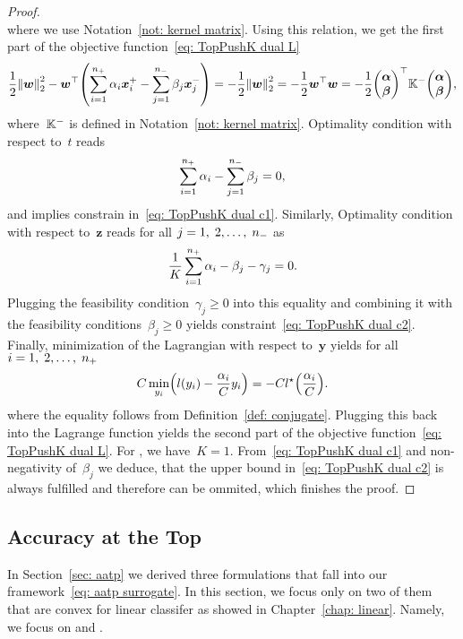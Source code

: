 \begin{proof}
\begin{equation*}
  \end{equation*}
  where we use Notation~\ref{not: kernel matrix}. Using this relation, we get the first part of the objective function~\eqref{eq: TopPushK dual L} 
  \begin{equation*}
    \frac{1}{2} \norm{\bm{w}}_{2}^{2} - \bm{w}^{\top} \Brac{\sum_{i = 1}^{\npos} \alpha_i \bm{x}^+_i - \sum_{j = 1}^{\nneg} \beta_j \bm{x}^-_j}
      = - \frac{1}{2} \norm{\bm{w}}_{2}^{2}
      = - \frac{1}{2} \bm{w}^{\top} \bm{w}
      = - \frac{1}{2} \vecab^{\top} \Kneg \vecab,
  \end{equation*}
  where~$\mathbb{K}^{-}$ is defined in Notation~\ref{not: kernel matrix}. Optimality condition with respect to~$t$ reads 
  \begin{equation*}
    \sum_{i = 1}^{n_{+}} \alpha_i - \sum_{j = 1}^{n_{-}} \beta_j = 0,
  \end{equation*}
  and implies constrain in~\eqref{eq: TopPushK dual c1}. Similarly, Optimality condition with respect to~$\bm{z}$ reads for all $j = 1, \; 2, \ldots, \; n_{-}$ as 
  \begin{equation*}
    \frac{1}{K} \sum_{i = 1}^{n_{+}} \alpha_i - \beta_j - \gamma_j = 0.
  \end{equation*}
  Plugging the feasibility condition~$\gamma_j \geq 0$ into this equality and combining it with the feasibility conditions~$\beta_j \geq 0$ yields constraint~\eqref{eq: TopPushK dual c2}. Finally, minimization of the Lagrangian with respect to~$\bm{y}$ yields for all $i = 1, \; 2, \ldots, \; n_{+}$ 
  \begin{equation*}
    C \min_{y_i} \Brac{l(y_i) - \frac{\alpha_i}{C} y_i} = - C l^{\star} \Brac{\frac{\alpha_i}{C}}.
  \end{equation*}
  where the equality follows from Definition~\ref{def: conjugate}. Plugging this back into the Lagrange function yields the second part of the objective function~\eqref{eq: TopPushK dual L}. For \TopPush, we have~$K = 1.$ From~\eqref{eq: TopPushK dual c1} and non-negativity of~$\beta_j$ we deduce, that the upper bound in~\eqref{eq: TopPushK dual c2} is always fulfilled and therefore can be ommited, which finishes the proof. 
\end{proof}

\subsection{Accuracy at the Top}

In Section~\ref{sec: aatp} we derived three formulations that fall into our framework~\eqref{eq: aatp surrogate}. In this section, we focus only on two of them that are convex for linear classifer as showed in Chapter~\ref{chap: linear}. Namely, we focus on \TopMeanK and \PatMat.

